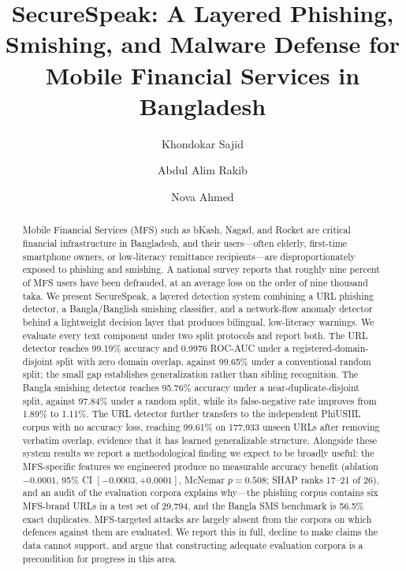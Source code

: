 \documentclass[manuscript,screen,review]{acmart}
\begin{document}
\title{SecureSpeak: A Layered Phishing, Smishing, and Malware Defense for Mobile Financial Services in Bangladesh}

\author{Khondokar Sajid}

\author{Abdul Alim Rakib}

\author{Nova Ahmed}

\renewcommand{\shortauthors}{Sajid, Rakib, and Ahmed}

\begin{abstract}
Mobile Financial Services (MFS) such as bKash, Nagad, and Rocket are critical financial infrastructure in Bangladesh, and their users---often elderly, first-time smartphone owners, or low-literacy remittance recipients---are disproportionately exposed to phishing and smishing. A national survey reports that roughly nine percent of MFS users have been defrauded, at an average loss on the order of nine thousand taka. We present SecureSpeak, a layered detection system combining a URL phishing detector, a Bangla/Banglish smishing classifier, and a network-flow anomaly detector behind a lightweight decision layer that produces bilingual, low-literacy warnings. We evaluate every text component under two split protocols and report both. The URL detector reaches 99.19\% accuracy and 0.9976 ROC-AUC under a registered-domain-disjoint split with zero domain overlap, against 99.65\% under a conventional random split; the small gap establishes generalization rather than sibling recognition. The Bangla smishing detector reaches 95.76\% accuracy under a near-duplicate-disjoint split, against 97.84\% under a random split, while its false-negative rate improves from 1.89\% to 1.11\%. The URL detector further transfers to the independent PhiUSIIL corpus with no accuracy loss, reaching 99.61\% on 177{,}933 unseen URLs after removing verbatim overlap, evidence that it has learned generalizable structure. Alongside these system results we report a methodological finding we expect to be broadly useful: the MFS-specific features we engineered produce no measurable accuracy benefit (ablation $-0.0001$, 95\% CI $[-0.0003, +0.0001]$, McNemar $p=0.508$; SHAP ranks 17--21 of 26), and an audit of the evaluation corpora explains why---the phishing corpus contains six MFS-brand URLs in a test set of 29{,}794, and the Bangla SMS benchmark is 56.5\% exact duplicates. MFS-targeted attacks are largely absent from the corpora on which defences against them are evaluated. We report this in full, decline to make claims the data cannot support, and argue that constructing adequate evaluation corpora is a precondition for progress in this area.
\end{abstract}
\end{document}
